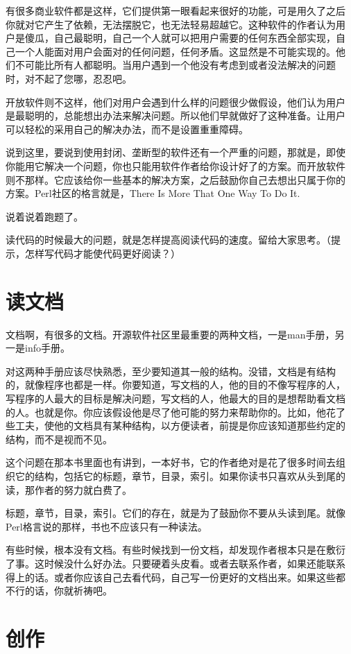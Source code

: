 \documentclass[10pt]{article}
\begin{document}
\begin{CJK*}{UTF8}{simsun}
有很多商业软件都是这样，它们提供第一眼看起来很好的功能，可是用久了之后
你就对它产生了依赖，无法摆脱它，也无法轻易超越它。这种软件的作者认为用
户是傻瓜，自己最聪明，自己一个人就可以把用户需要的任何东西全部实现，自
己一个人能面对用户会面对的任何问题，任何矛盾。这显然是不可能实现的。他
们不可能比所有人都聪明。当用户遇到一个他没有考虑到或者没法解决的问题
时，对不起了您哪，忍忍吧。

开放软件则不这样，他们对用户会遇到什么样的问题很少做假设，他们认为用户
是最聪明的，总能想出办法来解决问题。所以他们早就做好了这种准备。让用户
可以轻松的采用自己的解决办法，而不是设置重重障碍。

说到这里，要说到使用封闭、垄断型的软件还有一个严重的问题，那就是，即使
你能用它解决一个问题，你也只能用软件作者给你设计好了的方案。而开放软件
则不那样。它应该给你一些基本的解决方案，之后鼓励你自己去想出只属于你的
方案。Perl社区的格言就是，There Is More That One Way To Do It.

说着说着跑题了。

读代码的时候最大的问题，就是怎样提高阅读代码的速度。留给大家思考。（提
  示，怎样写代码才能使代码更好阅读？）

\section{读文档}

文档啊，有很多的文档。开源软件社区里最重要的两种文档，一是man手册，另
一是info手册。

对这两种手册应该尽快熟悉，至少要知道其一般的结构。没错，文档是有结构
的，就像程序也都是一样。你要知道，写文档的人，他的目的不像写程序的人，
写程序的人最大的目标是解决问题，写文档的人，他最大的目的是想帮助看文档
的人。也就是你。你应该假设他是尽了他可能的努力来帮助你的。比如，他花了
些工夫，使他的文档具有某种结构，以方便读者，前提是你应该知道那些约定的
结构，而不是视而不见。

这个问题在那本书里面也有讲到，一本好书，它的作者绝对是花了很多时间去组
织它的结构，包括它的标题，章节，目录，索引。如果你读书只喜欢从头到尾的
读，那作者的努力就白费了。

标题，章节，目录，索引。它们的存在，就是为了鼓励你不要从头读到尾。就像
Perl格言说的那样，书也不应该只有一种读法。

有些时候，根本没有文档。有些时候找到一份文档，却发现作者根本只是在敷衍
了事。这时候没什么好办法。只要硬着头皮看。或者去联系作者，如果还能联系
得上的话。或者你应该自己去看代码，自己写一份更好的文档出来。如果这些都
不行的话，你就祈祷吧。

\section{创作}


\end{CJK*}
\end{document}
